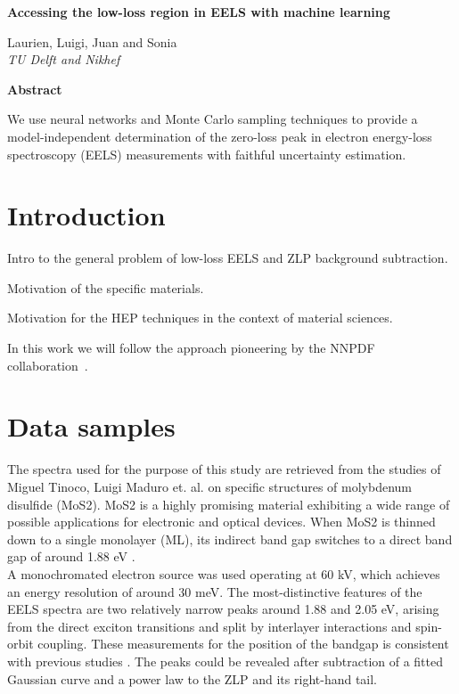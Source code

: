 \documentclass[11pt,a4paper]{article}
\numberwithin{equation}{section}
\numberwithin{figure}{section}
\numberwithin{table}{section}
\begin{document}

\vspace{2cm}

\begin{center}
  {\Large \bf
  Accessing the low-loss region in EELS with machine learning
  }
\vspace{1.4cm}


 Laurien, Luigi, Juan and Sonia\\


\vspace{0.4cm}
       {\it TU Delft and Nikhef
       }

       \vspace{1.0cm}

       {\bf \large Abstract}
       
\end{center}

We use neural networks and Monte Carlo sampling techniques
to provide a model-independent determination of the zero-loss peak
in electron energy-loss spectroscopy (EELS) measurements with faithful uncertainty estimation.

\tableofcontents

\section{Introduction}

Intro to the general problem of low-loss EELS and ZLP background subtraction.

Motivation of the specific materials.

Motivation for the HEP techniques in the context of material sciences.

In this work we will follow the approach pioneering by the NNPDF collaboration~\cite{Ball:2017nwa}.

\section{Data samples}

The spectra used for the purpose of this study are retrieved from the studies of Miguel Tinoco, Luigi Maduro et. al.  \cite{soniamos2} on specific structures of molybdenum disulfide (MoS2). MoS2 is a highly promising material exhibiting a wide range of possible applications for electronic and optical devices. When MoS2 is thinned down to a single monolayer (ML), its indirect band gap switches to a direct band gap of around 1.88 eV \cite{nerl}. \\
A monochromated electron source was used operating at 60 kV, which achieves an energy resolution of around 30 meV. The most-distinctive features of the EELS spectra are two relatively narrow peaks around 1.88 and 2.05 eV, arising from the direct exciton transitions and split by interlayer interactions and spin-orbit coupling. These measurements for the position of the bandgap is consistent with previous studies \cite{nerl, komsa}. The peaks could be revealed after subtraction of a fitted Gaussian curve and a power law to the ZLP and its right-hand tail. \\
\end{document}
